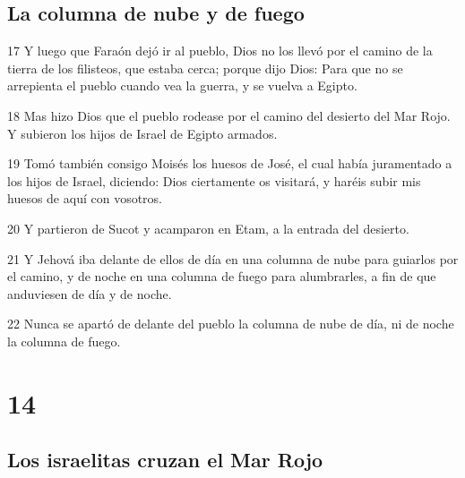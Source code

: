 \section*{La columna de nube y de fuego}

\par 17 Y luego que Faraón dejó ir al pueblo, Dios no los llevó por el camino de la tierra de los filisteos, que estaba cerca; porque dijo Dios: Para que no se arrepienta el pueblo cuando vea la guerra, y se vuelva a Egipto.
\par 18 Mas hizo Dios que el pueblo rodease por el camino del desierto del Mar Rojo. Y subieron los hijos de Israel de Egipto armados.
\par 19 Tomó también consigo Moisés los huesos de José, el cual había juramentado a los hijos de Israel, diciendo: Dios ciertamente os visitará, y haréis subir mis huesos de aquí con vosotros.
\par 20 Y partieron de Sucot y acamparon en Etam, a la entrada del desierto.
\par 21 Y Jehová iba delante de ellos de día en una columna de nube para guiarlos por el camino, y de noche en una columna de fuego para alumbrarles, a fin de que anduviesen de día y de noche.
\par 22 Nunca se apartó de delante del pueblo la columna de nube de día, ni de noche la columna de fuego.

\chapter{14}

\section*{Los israelitas cruzan el Mar Rojo}

